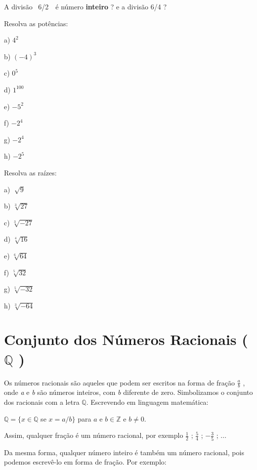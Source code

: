 \begin{exercicios}
	\exitem{} A divisão~ 6/2~~é  número \textbf{inteiro} ? e a divisão 6/4 ?

	\exitem{} Resolva as potências:
	\begin{multicols}{4}
		a) $4^2$
	
		b) $(-4)^3$
	
		c) $0^5$

		d) $1^100$
	
		e) $ -5^{2}$
	
		f) $-2^{4}$

		g) $-2^{4}$

		h)  $-2^{5}$
	\end{multicols}

	\exitem{} Resolva as raízes:
	\begin{multicols}{3}
		a)  \( \sqrt[]{9} \)

		b)  \( \sqrt[3]{27} \)
		
		c)  \( \sqrt[3]{-27} \)
		
		d)  \( \sqrt[4]{16} \)
		
		e)  \( \sqrt[6]{64} \)
		
		f)  \( \sqrt[5]{32} \)
		
		g)  \( \sqrt[5]{-32} \)
		
		h)  \( \sqrt[3]{-64} \)
	\end{multicols}
\end{exercicios}

\section{Conjunto dos Números Racionais ( \( \mathbb{Q} \) )}

\begin{justify}
Os números racionais são aqueles que podem ser escritos na forma de fração  \( \frac{a}{b} \) , onde \textit{a} e \textit{b} são números inteiros, com \textit{b} diferente de zero. Simbolizamos o conjunto dos racionais com a letra $\mathbb{Q}$. Escrevendo em linguagem matemática:
\end{justify}

 $ \mathbb{Q}  =  \{ x \in \mathbb{Q}$ se $x = a/b \} $  para $a$ e $b \in \mathbb{Z} $  e $b \neq 0$.

\begin{justify}
Assim, qualquer fração é um número racional, por exemplo  \( \frac{1}{2} \)  ;  \( \frac{5}{4} \)  ; \( -\frac{3}{5} \) ; ...
\end{justify}

\begin{justify}
Da mesma forma, qualquer número inteiro é também um número racional, pois podemos escrevê-lo em forma de fração. Por exemplo:
\end{justify}

